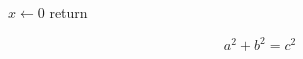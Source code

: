 \documentclass{article}
\begin{document}
\begin{algorithm}[H]\caption{Fold}\begin{algorithmic}[1]
\State $x \gets 0$
 \State return \EndIf
\end{algorithmic}\end{algorithm}
\[ a^2+b^2=c^2 \]
\end{document}

